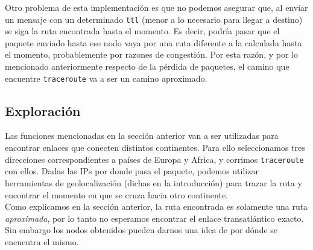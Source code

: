  Otro problema de esta implementaci\'on es que no podemos asegurar que, al enviar un mensaje con un determinado \texttt{ttl} (menor a lo necesario para llegar a destino) se siga la ruta encontrada hasta el momento. Es decir, podr\'ia pasar que el paquete enviado hasta ese nodo vaya por una ruta diferente a la calculada hasta el momento, probablemente por razones de congesti\'on. Por esta raz\'on, y por lo mencionado anteriormente respecto de la p\'erdida de paquetes, el camino que encuentre \texttt{traceroute} va a ser un camino aproximado. \\
 
 
 \subsection{Exploraci\'on}
 
Las funciones mencionadas en la secci\'on anterior van a ser utilizadas para encontrar enlaces que conecten distintos continentes. Para ello seleccionamos tres direcciones correspondientes a pa\'ises de Europa y Africa, y corrimos \texttt{traceroute} con ellos. Dadas las IPs por donde pasa el paquete, podemos utilizar herramientas de geolocalizaci\'on (dichas en la introducci\'on) para trazar la ruta y encontrar el momento en que se cruza hacia otro continente.\\

Como explicamos en la secci\'on anterior, la ruta encontrada es solamente una ruta \emph{aproximada}, por lo tanto no esperamos encontrar el enlace transatl\'antico exacto. Sin embargo los nodos obtenidos pueden darnos una idea de por d\'onde se encuentra el mismo.